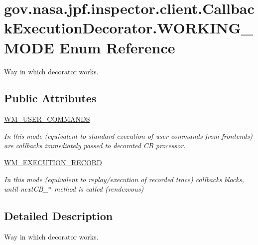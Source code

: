 \hypertarget{enumgov_1_1nasa_1_1jpf_1_1inspector_1_1client_1_1_callback_execution_decorator_1_1_w_o_r_k_i_n_g___m_o_d_e}{}\section{gov.\+nasa.\+jpf.\+inspector.\+client.\+Callback\+Execution\+Decorator.\+W\+O\+R\+K\+I\+N\+G\+\_\+\+M\+O\+DE Enum Reference}
\label{enumgov_1_1nasa_1_1jpf_1_1inspector_1_1client_1_1_callback_execution_decorator_1_1_w_o_r_k_i_n_g___m_o_d_e}


Way in which decorator works.  


\subsection*{Public Attributes}
\begin{DoxyCompactItemize}
\item 
\hyperlink{enumgov_1_1nasa_1_1jpf_1_1inspector_1_1client_1_1_callback_execution_decorator_1_1_w_o_r_k_i_n_g___m_o_d_e_ad92512bd45abad7bde4fdcb5e1daac49}{W\+M\+\_\+\+U\+S\+E\+R\+\_\+\+C\+O\+M\+M\+A\+N\+DS}
\begin{DoxyCompactList}\small\item\em In this mode (equivalent to standard execution of user commands from frontends) are callbacks immediately passed to decorated CB processor. \end{DoxyCompactList}\item 
\hyperlink{enumgov_1_1nasa_1_1jpf_1_1inspector_1_1client_1_1_callback_execution_decorator_1_1_w_o_r_k_i_n_g___m_o_d_e_a44e57f52bc0befd4422026d3d2f35e7a}{W\+M\+\_\+\+E\+X\+E\+C\+U\+T\+I\+O\+N\+\_\+\+R\+E\+C\+O\+RD}
\begin{DoxyCompactList}\small\item\em In this mode (equivalent to replay/execution of recorded trace) callbacks blocks, until next\+C\+B\+\_\+$\ast$ method is called (rendezvous) \end{DoxyCompactList}\end{DoxyCompactItemize}


\subsection{Detailed Description}
Way in which decorator works. 

